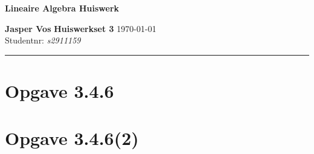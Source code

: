 \documentclass{article}
\begin{document}
{\Large \textbf{Lineaire Algebra Huiswerk}}

\bigskip

\textbf{Jasper Vos} \hfill \textbf{Huiswerkset 3} \hfill \today \\
Studentnr: \emph{s2911159}

\rule{\textwidth}{2pt}

\bigskip

\section*{Opgave 3.4.6}

\section*{Opgave 3.4.6(2)}
\end{document}
